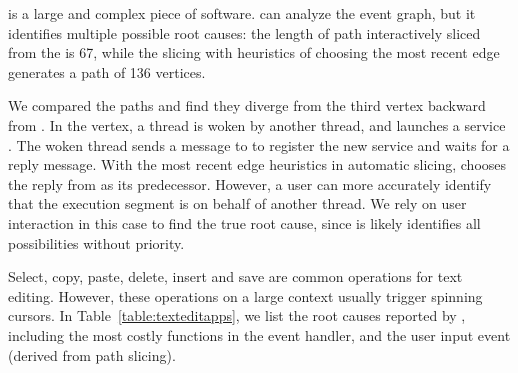 
 is a large and complex piece of software. \xxx can analyze
the event graph, but it identifies multiple possible root causes: the length of
path interactively sliced from the \spinningnode is 67, while the slicing with
heuristics of choosing the most recent edge generates a path of 136 vertices.

We compared the paths and find they diverge from the third vertex backward
from \spinningnode. In the vertex, a  thread is
woken by another  thread, and launches a service
. The woken thread sends a message
to  to register the new service and waits for a reply message.
With the most recent edge heuristics in automatic slicing, \xxx chooses the
reply from  as its predecessor. However, a user can more accurately
identify that the execution segment is on behalf of another 
thread. We rely on user interaction in this case to find the true root cause,
since \xxx is likely identifies all possibilities without priority.


Select, copy, paste, delete, insert and save are common operations for text
editing. However, these operations on a large context usually trigger spinning
cursors. In Table~\ref{table:texteditapps}, we list the root causes reported by
\xxx, including the most costly functions in the event handler, and the user
input event (derived from path slicing).

